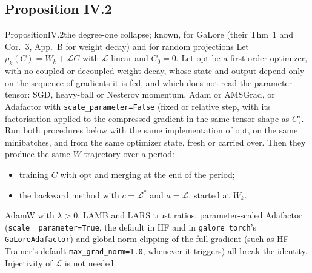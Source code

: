 \subsection{Proposition IV.2}\label{proof:IV.2}

\begin{restate}{Proposition}{IV.2}{the degree-one collapse; known, \citet{xtorrobahennigen2025duality} for GaLore (their
Thm~1 and Cor.~3, App.~B for weight decay) and \citet{hao2024flora} for random projections}
Let $\rho_k(C)=W_k+\mathcal LC$ with $\mathcal L$ linear and $C_0=0$. Let $\mathrm{opt}$ be a first-order optimizer, with
no coupled or decoupled weight decay, whose state and output depend only on the sequence of gradients it is fed, and
which does not read the parameter tensor: SGD, heavy-ball or Nesterov momentum, Adam or AMSGrad, or Adafactor with
\texttt{scale\_\allowbreak parameter=False} (fixed or relative step, with its factorisation applied to the compressed
gradient in the same tensor shape as $C$). Run both procedures below with the same implementation of $\mathrm{opt}$, on
the same minibatches, and from the same optimizer state, fresh or carried over. Then they produce the same
$W$-trajectory over a period:
\begin{itemize}
  \item training $C$ with $\mathrm{opt}$ and merging at the end of the period;
  \item the backward method with $c=\mathcal L^*$ and $a=\mathcal L$, started at $W_k$.
\end{itemize}
AdamW with $\lambda>0$, LAMB and LARS trust ratios, parameter-scaled Adafactor (\texttt{scale\_\allowbreak
parameter=True}, the default in HF and in \texttt{galore\_torch}'s \texttt{GaLoreAdafactor}) and global-norm clipping of
the full gradient (such as HF Trainer's default \texttt{max\_grad\_norm=1.0}, whenever it triggers) all break the
identity. Injectivity of $\mathcal L$ is not needed.


\end{restate}

